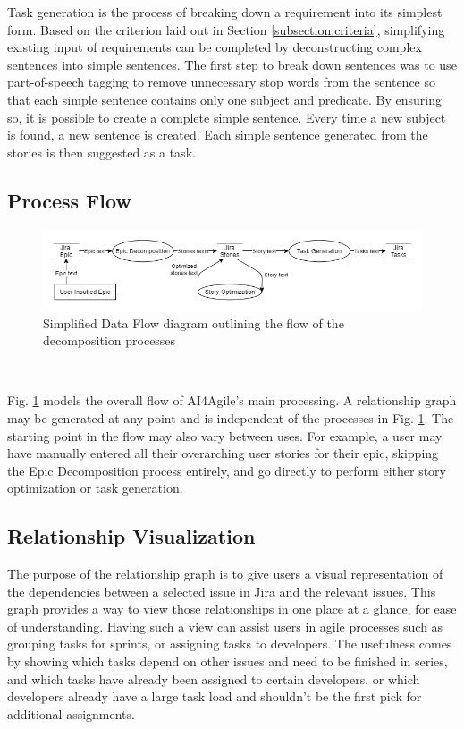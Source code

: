 Task generation is the process of breaking down a requirement into its simplest form. Based on the criterion laid out in Section \ref{subsection:criteria}, simplifying existing input of requirements can be completed by deconstructing complex sentences into simple sentences. 
The first step to break down sentences was to use part-of-speech tagging to remove unnecessary stop words from the sentence so that each simple sentence contains only one subject and predicate. By ensuring so, it is possible to create a complete simple sentence. Every time a new subject is found, a new sentence is created. Each simple sentence generated from the stories is then suggested as a task.

\subsection{Process Flow}

\begin{figure}
\centering
\includegraphics[width=\textwidth,keepaspectratio]{./figure/ExampleDataFlowDiagram.png}
\caption{Simplified Data Flow diagram outlining the flow of the decomposition processes}
\label{fig:ExampleDataFlowDiagram}
\end{figure}\

Fig. \ref{fig:ExampleDataFlowDiagram} models the overall flow of AI4Agile’s main processing. A relationship graph may be generated at any point and is independent of the processes in Fig. \ref{fig:ExampleDataFlowDiagram}.  The starting point in the flow may also vary between uses. For example, a user may have manually entered all their overarching user stories for their epic, skipping the Epic Decomposition process entirely, and go directly to perform either story optimization or task generation.

\subsection{Relationship Visualization}
The purpose of the relationship graph is to give users a visual representation of the dependencies between a selected issue in Jira and the relevant issues. This graph provides a way to view those relationships in one place at a glance, for ease of understanding. Having such a view can assist users in agile processes such as grouping tasks for sprints, or assigning tasks to developers. The usefulness comes by showing which tasks depend on other issues and need to be finished in series, and which tasks have already been assigned to certain developers, or which developers already have a large task load and shouldn't be the first pick for additional assignments. 

